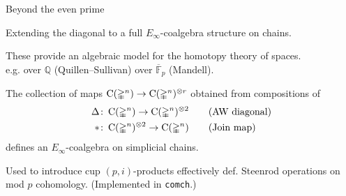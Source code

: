 
\begin{frame}[t]{Beyond the even prime}
	\pause

	Extending the diagonal to a full \textcolor{pblue}{$E_\infty$-coalgebra} structure on chains.

	\smallskip\pause

	These provide an algebraic model for the homotopy theory of spaces.\\ e.g. over $\mathbb Q$ (Quillen--Sullivan) over $\overline{\mathbb F}_p$ (Mandell).

	\smallskip\pause

	\begin{theorem}[Med.]
		The collection of maps $\operatorname{C}(\mathbb{\Delta}^n) \to \operatorname{C}(\mathbb{\Delta}^n)^{\otimes r}$ obtained from compositions of
		\begin{align*}
		\Delta &\colon \operatorname{C}(\mathbb{\Delta}^n) \to \operatorname{C}(\mathbb{\Delta}^n)^{\otimes 2}
		\qquad \text{(AW diagonal)} \\
		\ast &\colon \operatorname{C}(\mathbb{\Delta}^n)^{\otimes 2} \to \operatorname{C}(\mathbb{\Delta}^n)
		\qquad \text{(Join map)}
		\end{align*}
		defines an $E_\infty$-coalgebra on simplicial chains.
	\end{theorem}

	\pause {} \pause

	Used to introduce cup $(p,i)$-products effectively def. \textcolor{pblue}{Steenrod operations} on mod $p$ cohomology.
	\pause (Implemented in \texttt{comch}.)

	\smallskip\pause

\end{frame}
